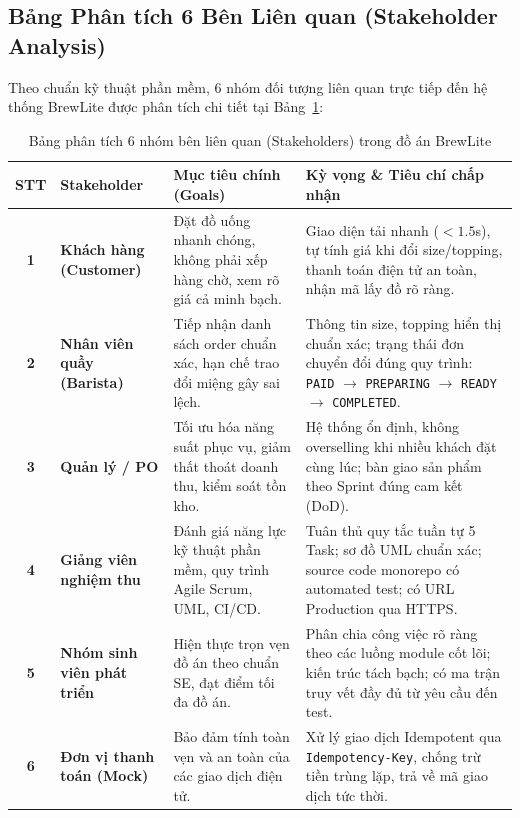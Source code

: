 \documentclass[a4paper]{article}
\begin{document}
\subsection{Bảng Phân tích 6 Bên Liên quan (Stakeholder Analysis)}
Theo chuẩn kỹ thuật phần mềm, 6 nhóm đối tượng liên quan trực tiếp đến hệ thống BrewLite được phân tích chi tiết tại Bảng~\ref{tab:stakeholders}:

\begin{table}[H]
\centering
\small
\begin{tabularx}{\textwidth}{|c|>{\raggedright\arraybackslash}p{3.2cm}|>{\raggedright\arraybackslash}p{4.2cm}|>{\raggedright\arraybackslash}X|}
\hline
\textbf{STT} & \textbf{Stakeholder} & \textbf{Mục tiêu chính (Goals)} & \textbf{Kỳ vọng \& Tiêu chí chấp nhận} \\ \hline
\textbf{1} & \textbf{Khách hàng (Customer)} & Đặt đồ uống nhanh chóng, không phải xếp hàng chờ, xem rõ giá cả minh bạch. & Giao diện tải nhanh ($<1.5$s), tự tính giá khi đổi size/topping, thanh toán điện tử an toàn, nhận mã lấy đồ rõ ràng. \\ \hline
\textbf{2} & \textbf{Nhân viên quầy (Barista)} & Tiếp nhận danh sách order chuẩn xác, hạn chế trao đổi miệng gây sai lệch. & Thông tin size, topping hiển thị chuẩn xác; trạng thái đơn chuyển đổi đúng quy trình: \texttt{PAID} $\rightarrow$ \texttt{PREPARING} $\rightarrow$ \texttt{READY} $\rightarrow$ \texttt{COMPLETED}. \\ \hline
\textbf{3} & \textbf{Quản lý / PO} & Tối ưu hóa năng suất phục vụ, giảm thất thoát doanh thu, kiểm soát tồn kho. & Hệ thống ổn định, không overselling khi nhiều khách đặt cùng lúc; bàn giao sản phẩm theo Sprint đúng cam kết (DoD). \\ \hline
\textbf{4} & \textbf{Giảng viên nghiệm thu} & Đánh giá năng lực kỹ thuật phần mềm, quy trình Agile Scrum, UML, CI/CD. & Tuân thủ quy tắc tuần tự 5 Task; sơ đồ UML chuẩn xác; source code monorepo có automated test; có URL Production qua HTTPS. \\ \hline
\textbf{5} & \textbf{Nhóm sinh viên phát triển} & Hiện thực trọn vẹn đồ án theo chuẩn SE, đạt điểm tối đa đồ án. & Phân chia công việc rõ ràng theo các luồng module cốt lõi; kiến trúc tách bạch; có ma trận truy vết đầy đủ từ yêu cầu đến test. \\ \hline
\textbf{6} & \textbf{Đơn vị thanh toán (Mock)} & Bảo đảm tính toàn vẹn và an toàn của các giao dịch điện tử. & Xử lý giao dịch Idempotent qua \texttt{Idempotency-Key}, chống trừ tiền trùng lặp, trả về mã giao dịch tức thời. \\ \hline
\end{tabularx}
\caption{Bảng phân tích 6 nhóm bên liên quan (Stakeholders) trong đồ án BrewLite}
\label{tab:stakeholders}
\end{table}
\end{document}
